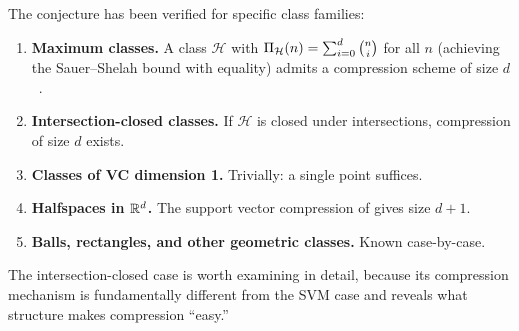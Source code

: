 The conjecture has been verified for specific class families:

\begin{enumerate}[leftmargin=*, itemsep=3pt]
\item \textbf{Maximum classes.}  A class $\mathcal{H}$ with
  $\Pi_\mathcal{H}(n) = \sum_{i=0}^d \binom{n}{i}$ for all $n$ (achieving
  the Sauer--Shelah bound with equality) admits a compression scheme of size
  $d$~\cite{FloydWarmuth1995,RubinsteinKroese2007}.

\item \textbf{Intersection-closed classes.}  If $\mathcal{H}$ is closed under
  intersections, compression of size $d$ exists.

\item \textbf{Classes of VC dimension 1.}  Trivially: a single point suffices.

\item \textbf{Halfspaces in $\mathbb{R}^d$.}  The support vector compression of
   gives size $d + 1$.

\item \textbf{Balls, rectangles, and other geometric classes.}  Known
  case-by-case.
\end{enumerate}

The intersection-closed case is worth examining in detail, because its
compression mechanism is fundamentally different from the SVM case and
reveals what structure makes compression ``easy.''

